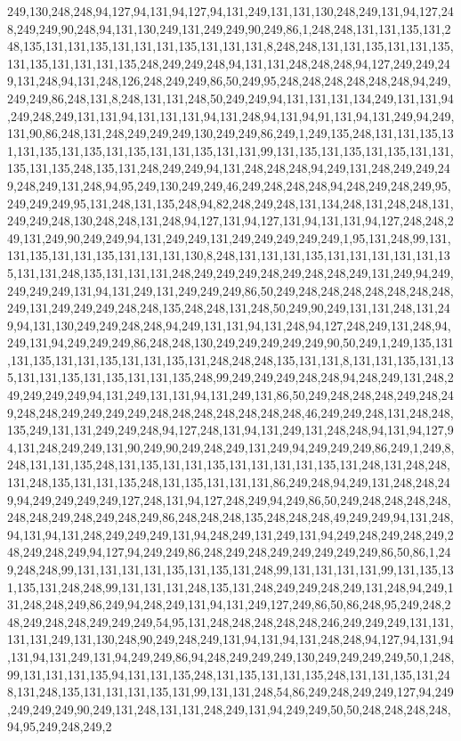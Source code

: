 249,130,248,248,94,127,94,131,94,127,94,131,249,131,131,130,248,249,131,94,127,248,249,249,90,248,94,131,130,249,131,249,249,90,249,86,1,248,248,131,131,135,131,248,135,131,131,135,131,131,131,135,131,131,131,8,248,248,131,131,135,131,131,135,131,135,131,131,131,135,248,249,249,248,94,131,131,248,248,248,94,127,249,249,249,131,248,94,131,248,126,248,249,249,86,50,249,95,248,248,248,248,248,248,94,249,249,249,86,248,131,8,248,131,131,248,50,249,249,94,131,131,131,134,249,131,131,94,249,248,249,131,131,94,131,131,131,94,131,248,94,131,94,91,131,94,131,249,94,249,131,90,86,248,131,248,249,249,249,130,249,249,86,249,1,249,135,248,131,131,135,131,131,135,131,135,131,135,131,131,135,131,131,99,131,135,131,135,131,135,131,131,135,131,135,248,135,131,248,249,249,94,131,248,248,248,94,249,131,248,249,249,249,248,249,131,248,94,95,249,130,249,249,46,249,248,248,248,94,248,249,248,249,95,249,249,249,95,131,248,131,135,248,94,82,248,249,248,131,134,248,131,248,248,131,249,249,248,130,248,248,131,248,94,127,131,94,127,131,94,131,131,94,127,248,248,249,131,249,90,249,249,94,131,249,249,131,249,249,249,249,249,1,95,131,248,99,131,131,135,131,131,135,131,131,131,130,8,248,131,131,131,135,131,131,131,131,131,135,131,131,248,135,131,131,131,248,249,249,249,248,249,248,248,249,131,249,94,249,249,249,249,131,94,131,249,131,249,249,249,86,50,249,248,248,248,248,248,248,248,249,131,249,249,249,248,248,135,248,248,131,248,50,249,90,249,131,131,248,131,249,94,131,130,249,249,248,248,94,249,131,131,94,131,248,94,127,248,249,131,248,94,249,131,94,249,249,249,86,248,248,130,249,249,249,249,249,90,50,249,1,249,135,131,131,135,131,131,135,131,131,135,131,248,248,248,135,131,131,8,131,131,135,131,135,131,131,135,131,135,131,131,135,248,99,249,249,249,248,248,94,248,249,131,248,249,249,249,249,94,131,249,131,131,94,131,249,131,86,50,249,248,248,248,249,248,249,248,248,249,249,249,249,248,248,248,248,248,248,248,46,249,249,248,131,248,248,135,249,131,131,249,249,248,94,127,248,131,94,131,249,131,248,248,94,131,94,127,94,131,248,249,249,131,90,249,90,249,248,249,131,249,94,249,249,249,86,249,1,249,8,248,131,131,135,248,131,135,131,131,135,131,131,131,131,135,131,248,131,248,248,131,248,135,131,131,135,248,131,135,131,131,131,86,249,248,94,249,131,248,248,249,94,249,249,249,249,127,248,131,94,127,248,249,94,249,86,50,249,248,248,248,248,248,248,249,248,249,248,249,86,248,248,248,135,248,248,248,49,249,249,94,131,248,94,131,94,131,248,249,249,249,131,94,248,249,131,249,131,94,249,248,249,248,249,248,249,248,249,94,127,94,249,249,86,248,249,248,249,249,249,249,249,86,50,86,1,249,248,248,99,131,131,131,131,135,131,135,131,248,99,131,131,131,131,99,131,135,131,135,131,248,248,99,131,131,131,248,135,131,248,249,249,248,249,131,248,94,249,131,248,248,249,86,249,94,248,249,131,94,131,249,127,249,86,50,86,248,95,249,248,248,249,248,248,249,249,249,54,95,131,248,248,248,248,248,246,249,249,249,131,131,131,131,249,131,130,248,90,249,248,249,131,94,131,94,131,248,248,94,127,94,131,94,131,94,131,249,131,94,249,249,86,94,248,249,249,249,130,249,249,249,249,50,1,248,99,131,131,131,135,94,131,131,135,248,131,135,131,131,135,248,131,131,135,131,248,131,248,135,131,131,131,135,131,99,131,131,248,54,86,249,248,249,249,127,94,249,249,249,249,90,249,131,248,131,131,248,249,131,94,249,249,50,50,248,248,248,248,94,95,249,248,249,2